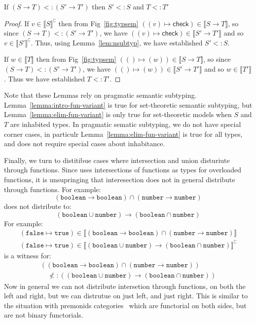 \documentclass[acmsmall,review,screen]{acmart}
\newcommand{\TRUE}{\mathtt{true}}
\newcommand{\FALSE}{\mathtt{false}}
\newcommand{\BOOLEAN}{\mathtt{boolean}}
\newcommand{\NUMBER}{\mathtt{number}}
\newcommand{\CHECK}{\mathsf{check}}
\newcommand{\fun}{\mathbin{\rightarrow}}
\newcommand{\sem}[1]{\llbracket{#1}\rrbracket}
\newcommand{\nsem}[1]{\llbracket{#1}\rrbracket^\complement}
\begin{document}
\begin{lemma}
  \label{lemma:elim-fun-variant}
  If $(S \fun T) <: (S' \fun T')$
  then $S' <: S$ and $T <: T'$
\end{lemma}
\begin{proof}
  If $v \in \nsem{S}$ then from Fig~\ref{fig:typsem}
  $((v) \mapsto \CHECK) \in \sem{S \fun T}$, so since 
  $(S \fun T) <: (S' \fun T')$, we have $((v) \mapsto \CHECK) \in \sem{S' \fun T'}$
  and so $v \in \nsem{S'}$. Thus, using Lemma~\ref{lem:nsubtyp},
  we have established $S' <: S$.

  If $w \in \sem{T}$ then from Fig~\ref{fig:typsem}
  $(() \mapsto (w)) \in \sem{S \fun T}$, so since 
  $(S \fun T) <: (S' \fun T')$, we have $(() \mapsto (w)) \in \sem{S' \fun T'}$
  and so $w \in \sem{T'}$. Thus we have established $T <: T'$.
\end{proof}

Note that these Lemmas rely on pragmatic semantic subtyping.
Lemma~\ref{lemma:intro-fun-variant} is true for set-theoretic
semantic subtyping, but Lemma~\ref{lemma:elim-fun-variant}
is only true for set-theoretic models when $S$ and $T$ are inhabited types.
In pragmatic sematic subtyping, we do not have special corner cases, in particulr
Lemma~\ref{lemma:elim-fun-variant} is true for all types,
and does not require special cases about inhabitance.

Finally, we turn to distitibue cases where intersection and union disturiute
through functions. Since  uses intersections of functions as
types for overloaded functions, it is unsupringing that interesection does
not in general distribute through functions. For example:
\[
  (\BOOLEAN\fun\BOOLEAN) \cap (\NUMBER\fun\NUMBER)
\]
does not distribute to:
\[
  (\BOOLEAN\cup\NUMBER)\fun(\BOOLEAN\cap\NUMBER)
\]
For example:
\[\begin{array}{l}
  (\FALSE\mapsto\TRUE) \in \sem{(\BOOLEAN\fun\BOOLEAN) \cap (\NUMBER\fun\NUMBER)} \\
  (\FALSE\mapsto\TRUE) \in \nsem{(\BOOLEAN\cup\NUMBER)\fun(\BOOLEAN\cap\NUMBER)}
\end{array}\]
is a witness for:
\[\begin{array}{l}
  ((\BOOLEAN\fun\BOOLEAN) \cap (\NUMBER\fun\NUMBER)) \\\quad
  \not<:
  ((\BOOLEAN\cup\NUMBER)\fun(\BOOLEAN\cap\NUMBER))
\end{array}\]
Now in general we can not distribute intersetion through functions,
on both the left and right, but we can distrutue on just left, and just right.
This is similar to the situation with premonids categories~\cite{??} which
are functorial on both sides, but are not binary functorials.
\end{document}

